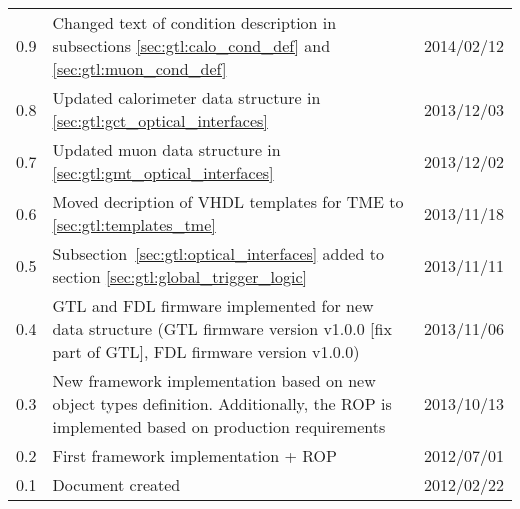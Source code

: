 \begin{longtable}{|c|p{}|c|}
0.9 & Changed text of condition description in subsections \ref{sec:gtl:calo_cond_def} and \ref{sec:gtl:muon_cond_def} & 2014/02/12\\
0.8 & Updated calorimeter data structure in \ref{sec:gtl:gct_optical_interfaces} & 2013/12/03\\
0.7 & Updated muon data structure in \ref{sec:gtl:gmt_optical_interfaces} & 2013/12/02\\
0.6 & Moved decription of VHDL templates for TME to \ref{sec:gtl:templates_tme} & 2013/11/18\\
0.5 & Subsection~\ref{sec:gtl:optical_interfaces} added to section \ref{sec:gtl:global_trigger_logic} & 2013/11/11\\
0.4 & GTL and FDL firmware implemented for new data structure (GTL firmware version v1.0.0 [fix part of GTL], FDL firmware version v1.0.0) & 2013/11/06\\
0.3 & New framework implementation based on new object types definition. Additionally, the ROP is implemented based on production requirements & 2013/10/13\\
0.2 & First framework implementation + ROP  & 2012/07/01\\
0.1 & Document created & 2012/02/22\\
\hline
\end{longtable}

\clearpage{}
